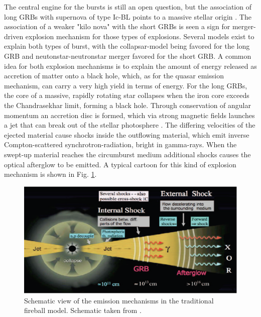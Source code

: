 The central engine for the bursts is still an open question, but the association
of long GRBs with supernova of type Ic-BL points to a massive stellar origin
\citep{Woosley2006, Hjorth2013}. The association of a weaker "kilo nova"
with
the short GRBs is seen a sign for merger-driven explosion mechanism
\citep{Tanvir2013} for those types of explosions. Several models exist to
explain both types of burst, with
the collapsar-model being favored for the long
GRB and neutonstar-neutronstar
merger favored for the short GRB. A common idea
for both explosion mechanisms is
to explain the amount of energy released as
accretion of matter onto a black
hole, which, as for the quasar emission
mechanism, can carry a very high yield in
terms of energy. For the long GRBs,
the core of a massive, rapidly rotating star
collapses when the iron core
exceeds the Chandrasekhar limit, forming a black
hole. Through conservation of
angular momentum an accretion disc is formed,
which via strong magnetic fields
launches a jet that can break out of the stellar
photosphere
\citep{Woosley2006a}. The differing velocities of the ejected
material cause
shocks inside the outflowing material, which emit inverse
Compton-scattered
synchrotron-radiation, bright in gamma-rays.  When the
swept-up material reaches
the circumburst medium additional shocks causes the optical afterglow to be
emitted. A typical cartoon for this kind of
explosion mechanism is shown in Fig.
\ref{fig:intro:grbglow}.

\begin{figure}[htb]
	
	\includegraphics[width=\textwidth]{gfx/grbmec}
	
	\caption{Schematic view of the emission mechanisms in the traditional fireball
model. Schematic taken from \citet{Meszaros2014}.}
	
	\label{fig:intro:grbglow}
\end{figure}

